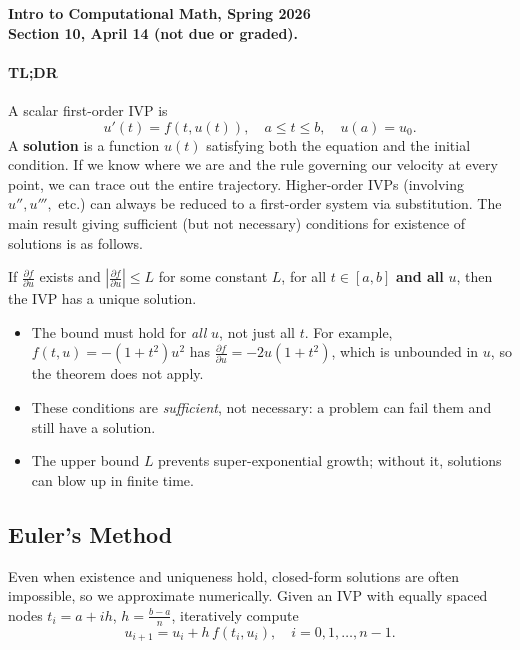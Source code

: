 \documentclass[11pt]{article}
\begin{document}
\begin{center}
{\bf Intro to Computational Math, Spring 2026\\
Section 10, April 14 (not due or graded).\\
}
\end{center}

\paragraph{TL;DR}


A scalar first-order IVP is
\[
u'(t) = f(t,u(t)), \quad a \leq t \leq b, \quad u(a) = u_0.
\]
A \textbf{solution} is a function $u(t)$ satisfying both the equation and the initial condition. If we know where we are and the rule governing our velocity at every point, we can trace out the entire trajectory. Higher-order IVPs (involving $u'', u''',$ etc.) can always be reduced to a first-order system via substitution. The main result giving sufficient (but not necessary) conditions for existence of solutions is as follows.

\begin{theorem*}
If $\frac{\partial f}{\partial u}$ exists and $\left|\frac{\partial f}{\partial u}\right| \leq L$ for some constant $L$, for all $t \in [a,b]$ \textbf{and all} $u$, then the IVP has a unique solution.
\end{theorem*}


\begin{itemize}[nosep]
    \item The bound must hold for \emph{all} $u$, not just all $t$. For example, $f(t,u) = -(1+t^2)u^2$ has $\frac{\partial f}{\partial u} = -2u(1+t^2)$, which is unbounded in $u$, so the theorem does not apply.
    \item These conditions are \emph{sufficient}, not necessary: a problem can fail them and still have a solution.
    \item The upper bound $L$ prevents super-exponential growth; without it, solutions can blow up in finite time.
\end{itemize}

\subsection*{Euler's Method}

Even when existence and uniqueness hold, closed-form solutions are often impossible, so we approximate numerically. Given an IVP with equally spaced nodes $t_i = a + ih$, $h = \frac{b-a}{n}$, iteratively compute
\[
u_{i+1} = u_i + h\,f(t_i, u_i), \quad i = 0, 1, \ldots, n-1.
\]
\end{document}

